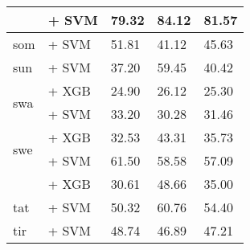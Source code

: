 \begin{table*}[ht]
\begin{tabular}{@{}llp{1.1cm}p{1.1cm}p{1.1cm}@{}}
                                           & \citep{snegirev2025russianfocusedembeddersexplorationrumteb} + SVM & 79.32                           & 84.12                              & 81.57                             \\
        \midrule
        som                                & \citep{wang2024multilingual} + SVM                                 & 51.81                           & 41.12                              & 45.63                             \\
        \midrule
        sun                                & \citep{wang2024multilingual} + SVM                                 & 37.20                           & 59.45                              & 40.42                             \\
        \midrule
        \multirow{2}{*}{swa}               & \citep{wang2023improving} + XGB                                    & 24.90                           & 26.12                              & 25.30                             \\
                                           & \citep{wang2024multilingual} + SVM                                 & 33.20                           & 30.28                              & 31.46                             \\
        \midrule
        \multirow{2}{*}{swe}               & \citep{wang2024multilingual} + XGB                                 & 32.53                           & 43.31                              & 35.73                             \\
                                           & \citep{wang2024multilingual} + SVM                                 & 61.50                           & 58.58                              & 57.09                             \\
                                           & \citep{kummervold-etal-2021-operationalizing} + XGB                & 30.61                           & 48.66                              & 35.00                             \\
        \midrule
        tat                                & \citep{wang2024multilingual} + SVM                                 & 50.32                           & 60.76                              & 54.40                             \\
        \midrule
        tir                                & \citep{wang2024multilingual} + SVM                                 & 48.74                           & 46.89                              & 47.21                             \\

\end{tabular}
\end{table*}
